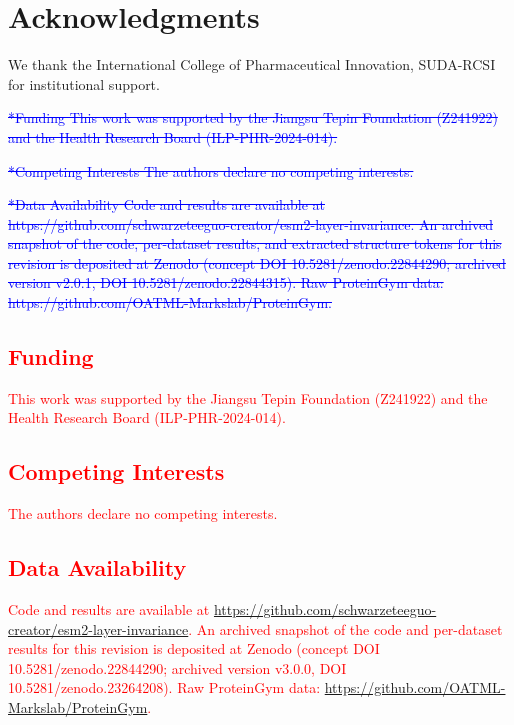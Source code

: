 \documentclass[11pt,a4paper]{article}
\newcommand{\rev}[1]{\textcolor{red}{#1}}
\begin{document}
\section*{Acknowledgments}
We thank the International
College of Pharmaceutical Innovation, SUDA-RCSI for institutional support.

\textcolor{blue}{\sout{*Funding
This work was supported by the Jiangsu Tepin Foundation (Z241922) and
the Health Research Board (ILP-PHR-2024-014).}}

\textcolor{blue}{\sout{*Competing Interests
The authors declare no competing interests.}}

\textcolor{blue}{\sout{*Data Availability
Code and results are available at https://github.com/schwarzeteeguo-creator/esm2-layer-invariance.
An archived snapshot of the code, per-dataset results, and extracted
structure tokens for this revision is deposited at Zenodo (concept DOI
10.5281/zenodo.22844290; archived version v2.0.1, DOI 10.5281/zenodo.22844315).
Raw ProteinGym data: https://github.com/OATML-Markslab/ProteinGym.}}

\textcolor{red}{\section*{Funding}
\rev{This work was supported by the Jiangsu Tepin Foundation (Z241922) and
the Health Research Board (ILP-PHR-2024-014).}}

\textcolor{red}{\section*{Competing Interests}
\rev{The authors declare no competing interests.}}

\textcolor{red}{\section*{Data Availability}
Code and results are available at \url{https://github.com/schwarzeteeguo-creator/esm2-layer-invariance}.
\rev{An archived snapshot of the code and per-dataset results for this
revision is deposited at Zenodo (concept DOI
10.5281/zenodo.22844290; archived version v3.0.0, DOI 10.5281/zenodo.23264208).}
Raw ProteinGym data: \url{https://github.com/OATML-Markslab/ProteinGym}.}
\end{document}
